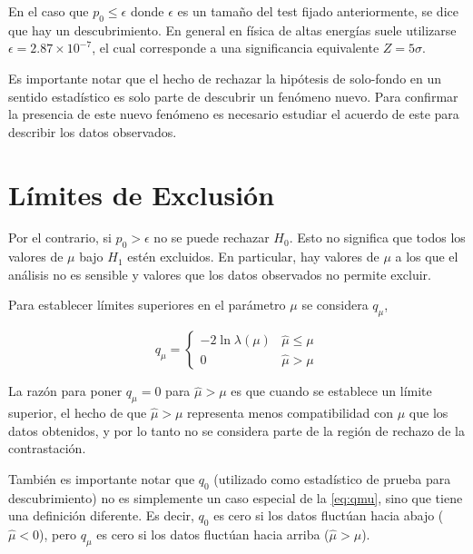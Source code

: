 En el caso que $p_0 \leq \epsilon$ donde $\epsilon$ es un tamaño del test
fijado anteriormente, se dice que hay un descubrimiento. En general en física de
altas energías suele utilizarse $\epsilon = 2.87 \times 10^{-7}$, el cual
corresponde a una significancia equivalente $Z=5\sigma$.

Es importante notar que el hecho de rechazar la hipótesis de solo-fondo en un
sentido estadístico es solo parte de descubrir un fenómeno nuevo.
Para confirmar la presencia de este nuevo fenómeno es necesario estudiar
el acuerdo de este para describir los datos observados.


\section{Límites de Exclusión}
\label{sec:limits}

Por el contrario, si $p_0> \epsilon$ no se puede rechazar $H_0$. Esto no
significa que todos los valores de $\mu$ bajo $H_1$ estén excluidos.
En particular, hay valores de $\mu$ a los que el análisis no es sensible
y valores que los datos observados no permite excluir.

Para establecer límites superiores en el parámetro $\mu$ se considera
$q_\mu$,

\begin{equation}
  q_\mu =
  \begin{cases}
    -2 \ln \lambda(\mu) & \hat{\mu} \leq \mu \\
    0 & \hat{\mu} > \mu
  \end{cases} \label{eq:qmu}
\end{equation}

La razón para poner $q_\mu = 0$ para $\hat{\mu} > \mu$ es que cuando se
establece un límite superior, el hecho de que $\hat{\mu} > \mu$ representa menos
compatibilidad con $\mu$ que los datos obtenidos, y por lo tanto no se considera
parte de la región de rechazo de la contrastación.

También es importante notar que $q_0$ (utilizado como estadístico de prueba para
descubrimiento) no es simplemente un caso especial de la
\cref{eq:qmu}, sino que tiene una definición diferente. Es decir, $q_0$ es cero
si los datos fluctúan hacia abajo ($\hat{\mu}<0$), pero $q_\mu$ es cero si los
datos fluctúan hacia arriba ($\hat{\mu}>\mu$).

